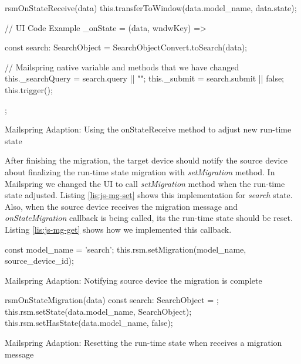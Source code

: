 \FloatBarrier
\begin{code}
\begin{js2}

rsmOnStateReceive(data) {
    this.transferToWindow(data.model_name, data.state);
}

// UI Code Example
_onState = (data, wndwKey) => {
    const search: SearchObject = SearchObjectConvert.toSearch(data);
    
    // Mailspring native variable and methods that we have changed
    this._searchQuery = search.query || "";
    this._submit = search.submit || false;
    this.trigger();
};
\end{js2}
\caption{Mailspring Adaption: Using the onStateReceive method to adjust new run-time state}
\label{lis:js-receive}
\end{code}
\FloatBarrier

After finishing the migration, the target device should notify the source device about finalizing the run-time state migration with \textit{setMigration} method. In Mailspring we changed the UI to call \textit{setMigration} method when the run-time state adjusted. Listing \ref{lis:js-mg-set} shows this implementation for \textit{search} state.
Also, when the source device receives the migration message and \textit{onStateMigration} callback is being called, its the run-time state should be reset. Listing \ref{lis:js-mg-get} shows how we implemented this callback. 

\FloatBarrier
\begin{code}
\begin{js2}
const model_name = 'search';
this.rsm.setMigration(model_name, source_device_id);
\end{js2}
\caption{Mailspring Adaption: Notifying source device the migration is complete}
\label{lis:js-mg-set}
\end{code}
\FloatBarrier

\FloatBarrier
\begin{code}
\begin{js2}
rsmOnStateMigration(data) {
    const search: SearchObject = {};
    this.rsm.setState(data.model_name, SearchObject);
    this.rsm.setHasState(data.model_name, false);
}
\end{js2}
\caption{Mailspring Adaption: Resetting the run-time state when receives a migration message}
\label{lis:js-mg-get}
\end{code}
\FloatBarrier